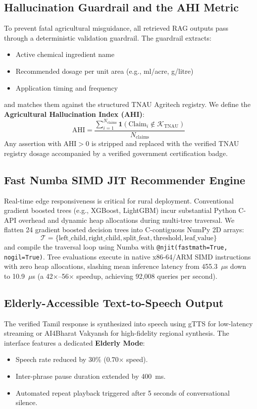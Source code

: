 \documentclass[conference]{IEEEtran}
\begin{document}
\subsection{Hallucination Guardrail and the AHI Metric}
To prevent fatal agricultural misguidance, all retrieved RAG outputs pass through a deterministic validation guardrail. The guardrail extracts:
\begin{itemize}
    \item Active chemical ingredient name
    \item Recommended dosage per unit area (e.g., ml/acre, g/litre)
    \item Application timing and frequency
\end{itemize}
and matches them against the structured TNAU Agritech registry. We define the \textbf{Agricultural Hallucination Index (AHI)}:
\begin{equation}
\text{AHI} = \frac{\sum_{i=1}^{N_{\text{claims}}} \mathbf{1}(\text{Claim}_i \notin \mathcal{K}_{\text{TNAU}})}{N_{\text{claims}}}
\end{equation}
Any assertion with $\text{AHI} > 0$ is stripped and replaced with the verified TNAU registry dosage accompanied by a verified government certification badge.

\subsection{Fast Numba SIMD JIT Recommender Engine}
Real-time edge responsiveness is critical for rural deployment. Conventional gradient boosted trees (e.g., XGBoost, LightGBM) incur substantial Python C-API overhead and dynamic heap allocations during multi-tree traversal. We flatten 24 gradient boosted decision trees into C-contiguous NumPy 2D arrays:
\begin{equation}
\mathcal{T} = \{\text{left\_child}, \text{right\_child}, \text{split\_feat}, \text{threshold}, \text{leaf\_value}\}
\end{equation}
and compile the traversal loop using Numba with \texttt{@njit(fastmath=True, nogil=True)}. Tree evaluations execute in native x86-64/ARM SIMD instructions with zero heap allocations, slashing mean inference latency from 455.3~$\mu$s down to 10.9~$\mu$s (a 42$\times$--56$\times$ speedup, achieving 92,008 queries per second).

\subsection{Elderly-Accessible Text-to-Speech Output}
The verified Tamil response is synthesized into speech using gTTS for low-latency streaming or AI4Bharat Vakyansh for high-fidelity regional synthesis. The interface features a dedicated \textbf{Elderly Mode}:
\begin{itemize}
    \item Speech rate reduced by 30\% (0.70$\times$ speed).
    \item Inter-phrase pause duration extended by 400~ms.
    \item Automated repeat playback triggered after 5 seconds of conversational silence.
\end{itemize}
\end{document}
